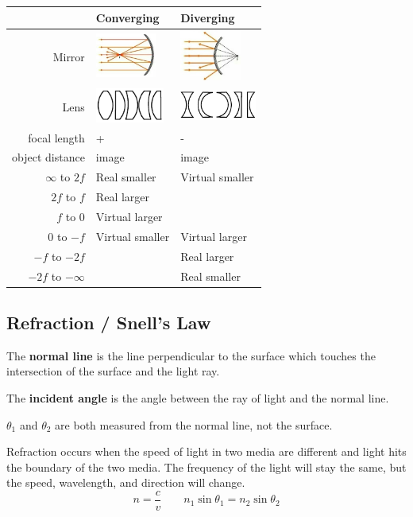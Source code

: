 \begin{center}
	\begin{tabular}{r | l l} 
		 & Converging & Diverging \\
		\hline
		Mirror & \includegraphics[width=2cm]{content/soundlight/ConvergingMirror.jpg} & \includegraphics[width=2cm]{content/soundlight/DivergingMirror.jpg} \\
		Lens & \includegraphics[width=2.25cm]{content/soundlight/ConvergingLenses.pdf} & \includegraphics[width=2.5cm]{content/soundlight/DivergingLenses.pdf} \\
		focal length & + & - \\
		\hline
		object distance & image & image \\
		\hline
		$\infty$ to $2f$ & Real smaller & Virtual smaller \\
		$2f$ to $f$ & Real larger & \\
		$f$ to $0$ & Virtual larger & \\
		\hline
		$0$ to $-f$ & Virtual smaller & Virtual larger \\
		$-f$ to $-2f$ & & Real larger \\
		$-2f$ to $-\infty$ & & Real smaller \\
	\end{tabular}
\end{center}

\subsection{Refraction / Snell's Law}

The \textbf{normal line} is the line perpendicular to the surface which touches the intersection of the surface and the light ray.

The \textbf{incident angle} is the angle between the ray of light and the normal line.

$\theta_1$ and $\theta_2$ are both measured from the normal line, not the surface.

Refraction occurs when the speed of light in two media are different and light hits the boundary of the two media. The frequency of the light will stay the same, but the speed, wavelength, and direction will change.
\[
	n = \frac{c}{v} \qquad n_1 \sin \theta_1 = n_2 \sin \theta_2
\]

